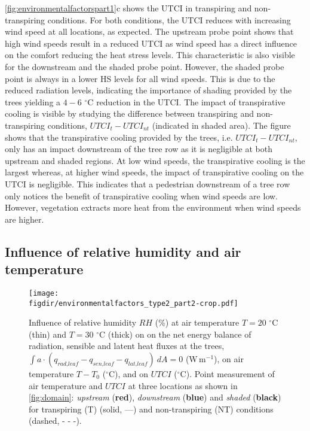 \cref{fig:environmentalfactorspart1}c shows the UTCI in transpiring and non-transpiring conditions. For both conditions, the UTCI reduces with increasing wind speed at all locations, as expected. The upstream probe point shows that high wind speeds result in a reduced UTCI as wind speed has a direct influence on the comfort reducing the heat stress levels. This characteristic is also visible for the downstream and the shaded probe point. However, the shaded probe point is always in a lower HS levels for all wind speeds. This is due to the reduced radiation levels, indicating the importance of shading provided by the trees yielding a $4-6$ $^{\circ}$C reduction in the UTCI. The impact of transpirative cooling is visible by studying the difference between transpiring and non-transpiring conditions, $\textit{UTCI}_t-\textit{UTCI}_{\textit{nt}}$ (indicated in shaded area). The figure shows that the transpirative cooling provided by the trees, i.e. $\textit{UTCI}_t-\textit{UTCI}_{\textit{nt}}$, only has an impact downstream of the tree row as it is negligible at both upstream and shaded regions. At low wind speeds, the transpirative cooling is the largest whereas, at higher wind speeds, the impact of transpirative cooling on the UTCI is negligible. This indicates that a pedestrian downstream of a tree row only notices the benefit of transpirative cooling when wind speeds are low. However, vegetation extracts more heat from the environment when wind speeds are higher.

\subsection{Influence of relative humidity and air temperature}

				
	\begin{sidewaysfigure}[p]
		\centering
		\texttt{[image: \\figdir/environmentalfactors\_type2\_part2-crop.pdf]}
		\caption{Influence of relative humidity $RH$ (\%) at air temperature $T=20$ $^{\circ}$C (thin) and $T=30$ $^{\circ}$C (thick) on  on the net energy balance of radiation, sensible and latent heat fluxes at the trees, $\int a \cdot (q_{\textit{rad,leaf}}-q_{\textit{sen,leaf}}-q_{\textit{lat,leaf}})\ dA = 0$ (W\,m$^{-1}$),  on air temperature $T-T_0$ ($^{\circ}$C), and  on $\textit{UTCI}$ ($^{\circ}$C). Point measurement of air temperature and $UTCI$ at three locations as shown in \cref{fig:domain}: \textit{upstream} ({\color{flatuidarkred}\textbf{red}}), \textit{downstream} ({\color{flatuidarkblue}\textbf{blue}}) and \textit{shaded} (\textbf{black}) for transpiring (T) (solid, ---) and non-transpiring (NT) conditions (dashed, - - -).}
		\label{fig:environmentalfactorspart2}
	\end{sidewaysfigure}


